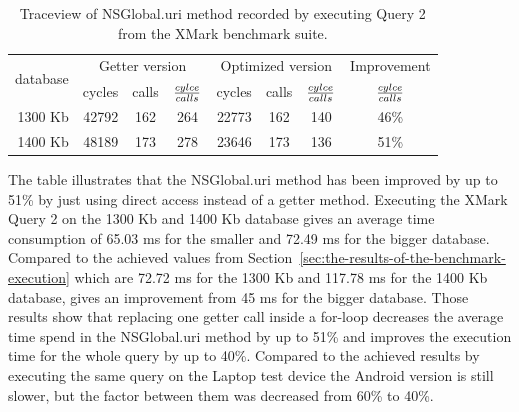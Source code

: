 \begin {table}[htpb] 
  \begin{center}
\begin {tabular} {|r|r|c|c|r|c|c||c|}
  	\hline
	\multirow{2}{*}{database}&\multicolumn{3}{c}{Getter version}&\multicolumn{3}{|c||}{Optimized version}&Improvement\\
	\cline{2-8}
	&cycles&calls&${cylce \over calls}$&cycles&calls&${cylce \over calls}$&${cylce \over calls}$\\
	\hline
	\hline
	1300 Kb&42792&162&264&22773&162&140&46\%\\
	\hline
	1400 Kb&48189&173&278&23646&173&136&51\%\\
	\hline
\end {tabular}
\caption {Traceview of \textsf{NSGlobal.uri} method recorded by executing Query 2 from the XMark benchmark suite.}
\label {tab:traceview-q2-optimized}
\end{center}
\end {table}
The table illustrates that the \textsf{NSGlobal.uri} method has been improved by up to 51\% by just using direct access instead of a getter method.
Executing the XMark Query 2 on the 1300 Kb and 1400 Kb database gives an average time consumption of 65.03 ms for the smaller and 72.49 ms for the bigger database.
Compared to the achieved values from Section~\ref{sec:the-results-of-the-benchmark-execution} which are 72.72 ms for the 1300 Kb and 117.78 ms for the 1400 Kb database, gives an improvement from 45 ms for the bigger database.
Those results show that replacing one getter call inside a for-loop decreases the average time spend in the \textsf{NSGlobal.uri} method by up to 51\% and improves the execution time  for the whole query by up to 40\%.
Compared to the achieved results by executing the same query on the Laptop test device the Android version is still slower, but the factor between them was decreased from 60\% to 40\%.\\

